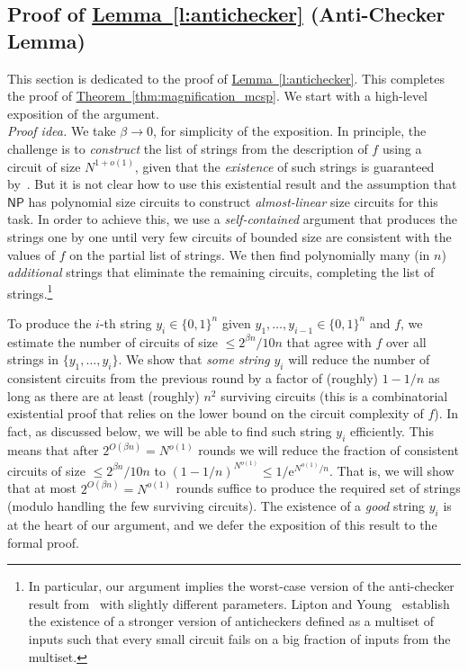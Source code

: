 \documentclass[11pt]{article}
\numberwithin{equation}{section}
\theoremstyle{definition}
\theoremstyle{plain}
\newcommand{\eee}{\mathrm e}
\newcommand{\expref}[2]{\hyperref[#2]{#1~\ref{#2}}}
\begin{document}
\subsection{Proof of \expref{Lemma}{l:antichecker} (Anti-Checker Lemma)}\label{ss:antichecker_lemma}

This section is dedicated to the proof of \expref{Lemma}{l:antichecker}. This completes the proof of \expref{Theorem}{thm:magnification_mcsp}. We start with a high-level exposition of the argument.\\

\noindent \emph{Proof  idea.} We take $\beta \to 0$, for simplicity of the exposition.
In principle, the challenge is to \emph{construct} the list of strings from the description of $f$ using a circuit of size $N^{1 + o(1)}$, given that the \emph{existence} of such strings is guaranteed %
%
%
by~\cite{DBLP:conf/stoc/LiptonY94}.
%
%
But it is not clear how to use this existential result and the assumption that $\mathsf{NP}$ has polynomial size circuits to construct \emph{almost-linear} size circuits for this task. In order to achieve this, we use a \emph{self-contained} argument that produces the strings one by one until very few circuits of bounded size are consistent with the values of $f$ on the partial list of strings. We then find polynomially many (in $n$) \emph{additional} strings that eliminate the remaining circuits, completing the list of strings.\footnote{In particular, our argument implies the worst-case version of the anti-checker result from~\cite{DBLP:conf/stoc/LiptonY94} with slightly different parameters. Lipton and Young~\cite{DBLP:conf/stoc/LiptonY94} establish the existence of a stronger version of anticheckers defined as a multiset of inputs such that every small circuit fails on a big fraction of inputs from the multiset.}

To produce the $i$-th string $y_i \in \{0,1\}^n$ given $y_1, \ldots, y_{i-1} \in \{0,1\}^n$ and $f$, we estimate the number of circuits of size $\leq 2^{\beta n}/10n$ that agree with $f$ over all strings in $\{y_1, \ldots, y_i\}$. We show that \emph{some string} $y_i$ will reduce the number of consistent circuits from the previous round by a factor of (roughly) $1 - 1/n$ as long as there are at least (roughly) $n^2$ surviving circuits (this is a combinatorial existential proof that relies on the lower bound on the circuit complexity of $f$). In fact, as discussed below, we will be able to find such string $y_i$ efficiently. This means that after $2^{O(\beta n)}=N^{o(1)}$ rounds we will reduce the fraction of consistent circuits of size $\leq 2^{\beta n}/10n$ to $(1-1/n)^{N^{o(1)}}\le 1/\eee^{N^{o(1)}/n}$. That is, we will 
show that at most $2^{O(\beta n)} = N^{o(1)}$ rounds suffice to produce the required set of strings (modulo handling the few surviving circuits). The existence of a \emph{good} string $y_i$ is at the heart of our argument, and we defer the exposition of this result to the formal proof.
\end{document}
